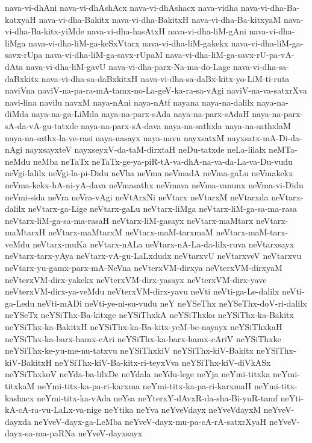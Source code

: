 {nava-vi-dhAni
nava-vi-dhAshAcx
nava-vi-dhAshacx
nava-vidha
nava-vi-dha-Ba-katxyaH
nava-vi-dha-Bakitx
nava-vi-dha-BakitxH
nava-vi-dha-Ba-kitxyaM
nava-vi-dha-Ba-kitx-yiMde
nava-vi-dha-hasAtxH
nava-vi-dha-liM-gAni
nava-vi-dha-liMga
nava-vi-dha-liM-ga-keSxVtarx
nava-vi-dha-liM-gakekx
nava-vi-dha-liM-ga-savx-rUpa
nava-vi-dha-liM-ga-savx-rUpaM
nava-vi-dha-liM-ga-savx-rU-pa-vA-dAta
nava-vi-dha-liM-gavU
nava-vi-dha-parx-Na-ma-do-Lage
nava-vi-dha-sa-daBxkitx
nava-vi-dha-sa-daBxkitxH
nava-vi-dha-sa-daBx-kitx-yo-LiM-ti-ruta
naviVna
naviV-na-pa-ra-mA-tamx-no-La-geV-ka-ra-sa-vAgi
naviV-na-va-satxrXva
navi-lina
navilu
navxM
naya-nAni
naya-nAtf
nayana
naya-na-dalilx
naya-na-diMda
naya-na-ga-LiMda
naya-na-parx-sAda
naya-na-parx-sAdaH
naya-na-parx-sA-da-vA-gu-tatxde
naya-na-parx-sA-dava
naya-na-sathxla
naya-na-sathxlaM
naya-na-sathx-la-ve-rasi
naya-nasayx
naya-navu
nayxsatxM
nayxsatx-mA-Di-da-nAgi
nayxsayxteV
nayxseyxV-da-taM-dirxtaH
neDu-tatxde
neLa-lilalx
neMTa-neMdu
neMba
neTaTx
neTaTx-ge-ya-piR-tA-va-dhA-na-va-da-La-va-Du-vudu
neVgi-lalilx
neVgi-la-pi-Didu
neVha
neVma
neVmadA
neVma-gaLu
neVmakekx
neVma-kekx-hA-ni-yA-dava
neVmasathx
neVmava
neVma-vanunx
neVma-vi-Didu
neVmi-sida
neVra
neVra-vAgi
neVtArxNi
neVtarx
neVtarxM
neVtarxda
neVtarx-dalilx
neVtarx-ga-Lige
neVtarx-gaLu
neVtarx-liMga
neVtarx-liM-ga-sa-ma-rasa
neVtarx-liM-ga-sa-ma-rasaH
neVtarx-liM-gasayx
neVtarx-maMtarx
neVtarx-maMtarxH
neVtarx-maMtarxM
neVtarx-maM-tarxmaM
neVtarx-maM-tarx-veMdu
neVtarx-muKa
neVtarx-nALa
neVtarx-nA-La-da-lilx-ruva
neVtarxsayx
neVtarx-tarx-yAya
neVtarx-vA-gu-LaLxdudx
neVtarxvU
neVtarxveV
neVtarxvu
neVtarx-yu-gamx-parx-mA-NeVna
neVterxVM-dirxya
neVterxVM-dirxyaM
neVterxVM-dirx-yakekx
neVterxVM-dirx-yasayx
neVterxVM-dirx-yave
neVterxVM-dirx-ya-veMdu
neVterxVM-dirx-yavu
neVti
neVti-ga-Le-dalilx
neVti-ga-Ledu
neVti-mADi
neVti-ye-ni-su-vudu
neY
neYSeThx
neYSeThx-doV-ri-dalilx
neYSeTx
neYSiThx-Ba-kitxge
neYSiThxkA
neYSiThxka
neYSiThx-ka-Bakitx
neYSiThx-ka-BakitxH
neYSiThx-ka-Ba-kitx-yeM-be-nayayx
neYSiThxkaH
neYSiThx-ka-barx-hamx-cAri
neYSiThx-ka-barx-hamx-cAriV
neYSiThxke
neYSiThx-ke-yu-me-nu-tatxvu
neYSiThxkiV
neYSiThx-kiV-Bakitx
neYSiThx-kiV-BakitxH
neYSiThx-kiV-Ba-kitx-ri-teyxVva
neYSiThx-kiV-diVkASx
neYSiThxkoV
neYda-ba-lilxDe
neYdala
neYdu-lege
neYja
neYmi-titxka
neYmi-titxkaM
neYmi-titx-ka-pa-ri-karxma
neYmi-titx-ka-pa-ri-karxmaH
neYmi-titx-kashacx
neYmi-titx-ka-vAda
neYsa
neYterxY-dAvxR-da-sha-Bi-yuR-tamf
neYti-kA-cA-ra-vu-LaLx-va-nige
neYtika
neYva
neYveVdayx
neYveVdayxM
neYveV-dayxda
neYveV-dayx-ga-LeMba
neYveV-dayx-mu-pa-cA-rA-satxrXyaH
neYveV-dayx-sa-ma-paRNa
neYveV-dayxsayx
}
